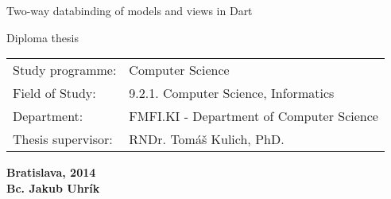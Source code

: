 \documentclass[oneside, 12pt]{book}
\def\mftitle{Two-way databinding of models and views in Dart}          %
\def\mfthesistype{Diploma thesis}             %
\def\mfauthor{Bc. Jakub Uhrík}                            %
\def\mfadvisor{RNDr. Tomáš Kulich, PhD.}                                  %
\def\mfplacedate{Bratislava, 2014}                        %
\def\mfprogram{Computer Science}                               %
\def\mfodbor{9.2.1. Computer Science, Informatics}                            %
\def\mfpracovisko{FMFI.KI - Department of Computer Science}                    %
\begin{document}
\vfill
\begin{center}
\begin{minipage}{1\textwidth}
\bigskip\bigskip
\begin{center}
\linespread{1}\LARGE\sc\mftitle
\end{center}
\smallskip
\centerline{\mfthesistype}
\bigskip
\bigskip
\bigskip\bigskip
\end{minipage}
\end{center}
\vfill
\begin{minipage}{0.8\textwidth}
\begin{tabular}{l l}
Study programme:& \mfprogram \\
Field of Study:& \mfodbor \\
Department:& \mfpracovisko\\
Thesis supervisor:&   \mfadvisor \\
\end{tabular}
\end{minipage}
\begin{center}
\end{center}
\vfill
{\bf\mfplacedate\\
\indent\mfauthor}
\eject 







% 




%
\end{document}
